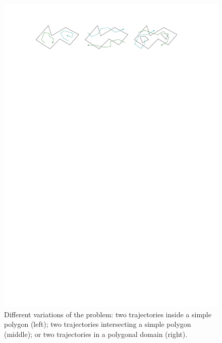 \documentclass[UKenglish]{lipics-v2019}
\begin{document}
\begin{figure} [b]
	\centering \includegraphics {variants} 
	\caption
	{
	  Different variations of the problem:
	  two trajectories inside a simple polygon (left);
	  two trajectories intersecting a simple polygon (middle);
	  or two trajectories in a polygonal domain (right).
	}  
	\addtolength{\belowcaptionskip}{-50pt}
	\label{fig:variants}
\end{figure}
\end{document}
